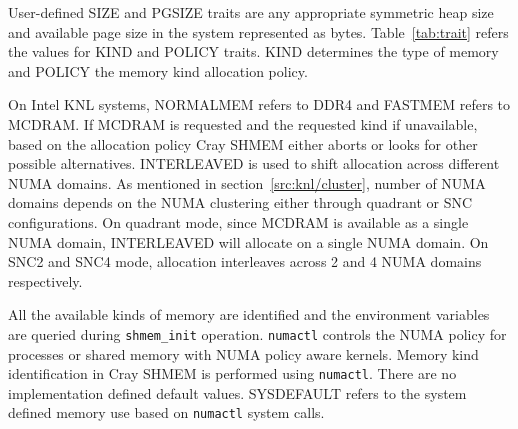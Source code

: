 User-defined SIZE and PGSIZE traits are any appropriate symmetric heap size
and available page size in the system represented as bytes.
Table~\ref{tab:trait} refers the values for KIND and POLICY traits. KIND
determines the type of memory and POLICY the memory kind allocation policy.

On Intel KNL systems, NORMALMEM refers to DDR4 and FASTMEM refers to
MCDRAM. If MCDRAM is requested and the requested kind if unavailable,
based on the allocation policy Cray SHMEM either aborts or looks for
other possible alternatives. INTERLEAVED is used to shift allocation
across
different NUMA domains. As mentioned in section~\ref{src:knl/cluster},
number of NUMA domains depends on the NUMA clustering either through
quadrant or SNC configurations. On quadrant mode, since MCDRAM is
available as a
single NUMA domain, INTERLEAVED will allocate on a single NUMA domain.
On SNC2 and SNC4 mode, allocation interleaves across 2 and 4 NUMA domains
respectively.

All the available kinds of memory are identified and the environment
variables are queried during \texttt{shmem\_init} operation.
\texttt{numactl} controls the NUMA policy for processes or shared memory
with NUMA policy aware kernels. Memory kind identification in Cray SHMEM
is performed using \texttt{numactl}. There are no implementation defined
default values. SYSDEFAULT refers to the system defined memory use based
on \texttt{numactl} system calls.